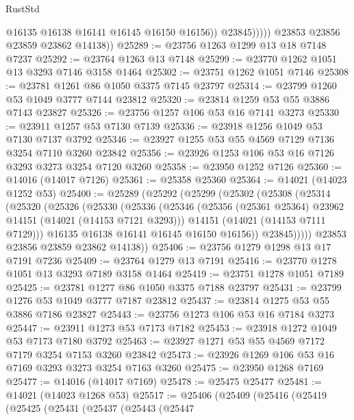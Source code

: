 \begin{lexlean}{RustStd}
\begin{coremodule}
                      @16135
                      @16138
                      @16141
                      @16145
                      @16150
                      @16156))
                  @23845)))))
        @23853
        @23856
        @23859
        @23862
        @14138))
@25289 := @23756 @1263 @1299 @13 @18 @7148 @7237
@25292 := @23764 @1263 @13 @7148
@25299 := @23770 @1262 @1051 @13 @3293 @7146 @3158 @1464
@25302 := @23751 @1262 @1051 @7146
@25308 := @23781 @1261 @86 @1050 @3375 @7145 @23797
@25314 := @23799 @1260 @53 @1049 @3777 @7144 @23812
@25320 := @23814 @1259 @53 @55 @3886 @7143 @23827
@25326 := @23756 @1257 @106 @53 @16 @7141 @3273
@25330 := @23911 @1257 @53 @7130 @7139
@25336 := @23918 @1256 @1049 @53 @7130 @7137 @3792
@25346 := @23927 @1255 @53 @55 @4569 @7129 @7136 @3254 @7110 @3260 @23842
@25356 := @23926 @1253 @106 @53 @16 @7126 @3293 @3273 @3254 @7120 @3260
@25358 := @23950 @1252 @7126
@25360 := @14016 (@14017 @7126)
@25361 := @25358 @25360
@25364 := @14021 (@14023 @1252 @53)
@25400 := @25289
    (@25292
      (@25299
        (@25302
          (@25308
            (@25314
              (@25320
                (@25326
                  (@25330
                    (@25336
                      (@25346
                        (@25356 (@25361 @25364) @23962 @14151 (@14021 (@14153 @7121 @3293)))
                        @14151
                        (@14021 (@14153 @7111 @7129)))
                      @16135
                      @16138
                      @16141
                      @16145
                      @16150
                      @16156))
                  @23845)))))
        @23853
        @23856
        @23859
        @23862
        @14138))
@25406 := @23756 @1279 @1298 @13 @17 @7191 @7236
@25409 := @23764 @1279 @13 @7191
@25416 := @23770 @1278 @1051 @13 @3293 @7189 @3158 @1464
@25419 := @23751 @1278 @1051 @7189
@25425 := @23781 @1277 @86 @1050 @3375 @7188 @23797
@25431 := @23799 @1276 @53 @1049 @3777 @7187 @23812
@25437 := @23814 @1275 @53 @55 @3886 @7186 @23827
@25443 := @23756 @1273 @106 @53 @16 @7184 @3273
@25447 := @23911 @1273 @53 @7173 @7182
@25453 := @23918 @1272 @1049 @53 @7173 @7180 @3792
@25463 := @23927 @1271 @53 @55 @4569 @7172 @7179 @3254 @7153 @3260 @23842
@25473 := @23926 @1269 @106 @53 @16 @7169 @3293 @3273 @3254 @7163 @3260
@25475 := @23950 @1268 @7169
@25477 := @14016 (@14017 @7169)
@25478 := @25475 @25477
@25481 := @14021 (@14023 @1268 @53)
@25517 := @25406
    (@25409
      (@25416
        (@25419
          (@25425
            (@25431
              (@25437
                (@25443
                  (@25447

\end{coremodule}
\end{lexlean}
